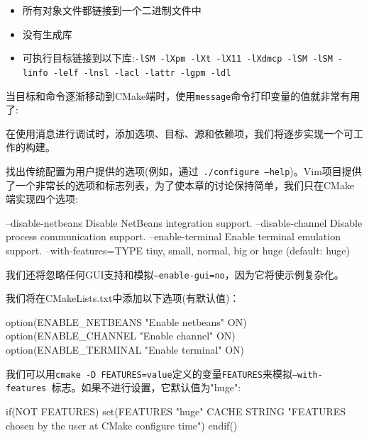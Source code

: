 \begin{itemize}
\item 所有对象文件都链接到一个二进制文件中

\item 没有生成库

\item 可执行目标链接到以下库:\texttt{-lSM -lXpm -lXt -lX11 -lXdmcp -lSM -lSM - linfo -lelf -lnsl -lacl -lattr -lgpm -ldl}

\end{itemize}


当目标和命令逐渐移动到CMake端时，使用\texttt{message}命令打印变量的值就非常有用了:


在使用消息进行调试时，添加选项、目标、源和依赖项，我们将逐步实现一个可工作的构建。


找出传统配置为用户提供的选项(例如，通过\texttt{ ./configure --help})。Vim项目提供了一个非常长的选项和标志列表，为了使本章的讨论保持简单，我们只在CMake端实现四个选项:

\begin{codebox}[shell]
--disable-netbeans Disable NetBeans integration support.
--disable-channel Disable process communication support.
--enable-terminal Enable terminal emulation support.
--with-features=TYPE tiny, small, normal, big or huge (default: huge)
\end{codebox}

我们还将忽略任何GUI支持和模拟\texttt{--enable-gui=no}，因为它将使示例复杂化。

我们将在CMakeLists.txt中添加以下选项(有默认值)：

\begin{codebox}[cmake]
option(ENABLE_NETBEANS "Enable netbeans" ON)
option(ENABLE_CHANNEL "Enable channel" ON)
option(ENABLE_TERMINAL "Enable terminal" ON)
\end{codebox}

我们可以用\texttt{cmake -D FEATURES=value}定义的变量\texttt{FEATURES}来模拟\texttt{--with-features }标志。如果不进行设置，它默认值为"huge":

\begin{codebox}[cmake]
if(NOT FEATURES)
    set(FEATURES "huge" CACHE STRING
"FEATURES chosen by the user at CMake configure time")
endif()
\end{codebox}

